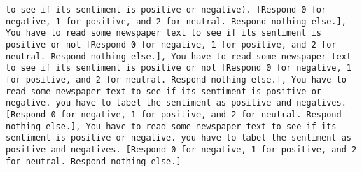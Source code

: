 \begin{lstlisting}[label=lst:poor_performing_prompts]
to see if its sentiment is positive or negative). [Respond 0 for negative, 1 for positive, and 2 for neutral. Respond nothing else.], You have to read some newspaper text to see if its sentiment is positive or not [Respond 0 for negative, 1 for positive, and 2 for neutral. Respond nothing else.], You have to read some newspaper text to see if its sentiment is positive or not [Respond 0 for negative, 1 for positive, and 2 for neutral. Respond nothing else.], You have to read some newspaper text to see if its sentiment is positive or negative. you have to label the sentiment as positive and negatives. [Respond 0 for negative, 1 for positive, and 2 for neutral. Respond nothing else.], You have to read some newspaper text to see if its sentiment is positive or negative. you have to label the sentiment as positive and negatives. [Respond 0 for negative, 1 for positive, and 2 for neutral. Respond nothing else.]

\end{lstlisting}
